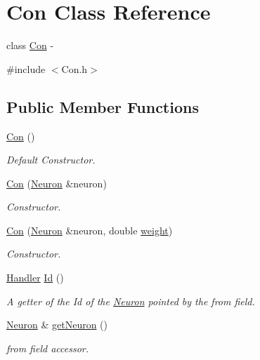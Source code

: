 \hypertarget{class_con}{
\section{Con Class Reference}
\label{class_con}
}


class \hyperlink{class_con}{Con} -\/  




{\ttfamily \#include $<$Con.h$>$}

\subsection*{Public Member Functions}
\begin{DoxyCompactItemize}
\item 
\hyperlink{class_con_a61621054cc1ee979385c81207ee0bceb}{Con} ()
\begin{DoxyCompactList}\small\item\em Default Constructor. \end{DoxyCompactList}\item 
\hyperlink{class_con_a7fab3ece0e894f44f31d10a21b1d49c7}{Con} (\hyperlink{class_neuron}{Neuron} \&neuron)
\begin{DoxyCompactList}\small\item\em Constructor. \end{DoxyCompactList}\item 
\hyperlink{class_con_ad0b1e0d1eefd2296b23a2cfea04fc559}{Con} (\hyperlink{class_neuron}{Neuron} \&neuron, double \hyperlink{class_con_a7f46485ba5b41971ea38641f9e7d1be0}{weight})
\begin{DoxyCompactList}\small\item\em Constructor. \end{DoxyCompactList}\item 
\hyperlink{_a_m_o_r_e_8h_abc871abb71cff6655b8172ee7240b8ef}{Handler} \hyperlink{class_con_aee0a0b6c5beff6e227f9ebf33af2d209}{Id} ()
\begin{DoxyCompactList}\small\item\em A getter of the Id of the \hyperlink{class_neuron}{Neuron} pointed by the from field. \end{DoxyCompactList}\item 
\hyperlink{class_neuron}{Neuron} \& \hyperlink{class_con_a2209567efd330a58825b5068a421afe1}{getNeuron} ()
\begin{DoxyCompactList}\small\item\em from field accessor. \end{DoxyCompactList}\item 

\end{DoxyCompactItemize}

